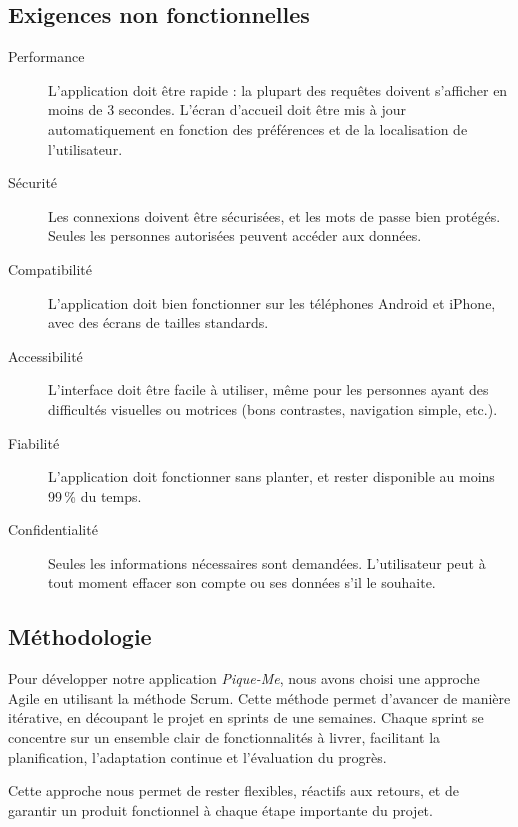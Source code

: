 \documentclass[12pt,a4paper]{article}
\begin{document}
\subsection{Exigences non fonctionnelles}
\begin{description}
  \item[Performance] L'application doit être rapide : la plupart des requêtes doivent s'afficher en moins de 3 secondes. L'écran d'accueil doit être mis à jour automatiquement en fonction des préférences et de la localisation de l'utilisateur.
  
  \item[Sécurité] Les connexions doivent être sécurisées, et les mots de passe bien protégés. Seules les personnes autorisées peuvent accéder aux données.
  
  \item[Compatibilité] L'application doit bien fonctionner sur les téléphones Android et iPhone, avec des écrans de tailles standards.
  
  \item[Accessibilité] L'interface doit être facile à utiliser, même pour les personnes ayant des difficultés visuelles ou motrices (bons contrastes, navigation simple, etc.).
  
  \item[Fiabilité] L'application doit fonctionner sans planter, et rester disponible au moins 99\,\% du temps.
  
  \item[Confidentialité] Seules les informations nécessaires sont demandées. L'utilisateur peut à tout moment effacer son compte ou ses données s'il le souhaite.
\end{description}


\subsection{Méthodologie}

Pour développer notre application \textit{Pique-Me}, nous avons choisi une approche Agile en utilisant la méthode Scrum. Cette méthode permet d'avancer de manière itérative, en découpant le projet en sprints de une semaines. Chaque sprint se concentre sur un ensemble clair de fonctionnalités à livrer, facilitant la planification, l'adaptation continue et l'évaluation du progrès.


Cette approche nous permet de rester flexibles, réactifs aux retours, et de garantir un produit fonctionnel à chaque étape importante du projet.
\end{document}
